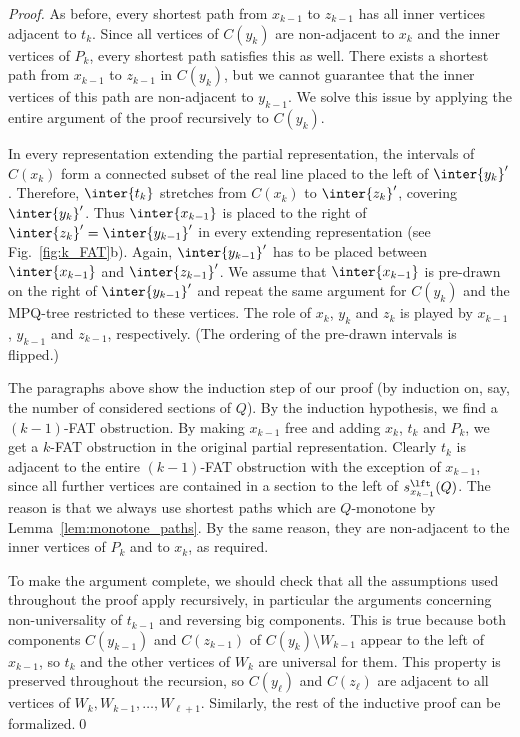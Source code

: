 \begin{proof}
As before, every shortest path from $x_{k-1}$ to $z_{k-1}$ has all inner vertices adjacent to $t_k$.
Since all vertices of $C(y_k)$ are non-adjacent to $x_k$ and the inner vertices of $P_k$, every
shortest path satisfies this as well.  There exists a shortest path from $x_{k-1}$ to
$z_{k-1}$ in $C(y_k)$, but we cannot guarantee that the inner vertices of this path are non-adjacent
to $y_{k-1}$. We solve this issue by applying the entire argument of the proof recursively to
$C(y_k)$.

In every representation extending the partial representation, the intervals of $C(x_k)$ form a
connected subset of the real line placed to the left of $\inter{y_k}'$. Therefore, $\inter{t_k}$
stretches from $C(x_k)$ to $\inter{z_k}'$, covering $\inter{y_k}'$. Thus $\inter{x_{k-1}}$ is placed
to the right of $\inter{z_k}' = \inter{y_{k-1}}'$ in every extending representation (see
Fig.~\ref{fig:k_FAT}b).  Again, $\inter{y_{k-1}}'$ has to be placed between $\inter{x_{k-1}}$ and
$\inter{z_{k-1}}'$. We assume that $\inter{x_{k-1}}$ is pre-drawn on the right of $\inter{y_{k-1}}'$
and repeat the same argument for $C(y_k)$ and the MPQ-tree restricted to these vertices. The role of
$x_k$, $y_k$ and $z_k$ is played by $x_{k-1}$, $y_{k-1}$ and $z_{k-1}$, respectively. (The ordering
of the pre-drawn intervals is flipped.)

The paragraphs above show the induction step of our proof (by induction on, say, the number of
considered sections of $Q$). By the induction hypothesis, we find a $(k-1)$-FAT obstruction.  By
making $x_{k-1}$ free and adding $x_k$, $t_k$ and $P_k$, we get a $k$-FAT obstruction in the
original partial representation.  Clearly $t_k$ is adjacent to the entire $(k-1)$-FAT obstruction
with the exception of $x_{k-1}$, since all further vertices are contained in a section to the left
of $s_{x_{k-1}}^\lft(Q)$. The reason is that we always use shortest paths which are $Q$-monotone by
Lemma~\ref{lem:monotone_paths}.  By the same reason, they are non-adjacent to the inner vertices of
$P_k$ and to $x_k$, as required.

To make the argument complete, we should check that all the assumptions used throughout the proof
apply recursively, in particular the arguments concerning non-universality of $t_{k-1}$ and
reversing big components. This is true because both components $C(y_{k-1})$ and $C(z_{k-1})$ of
$C(y_k) \setminus W_{k-1}$ appear to the left of $x_{k-1}$, so $t_k$ and the other vertices of $W_k$
are universal for them. This property is preserved throughout the recursion, so $C(y_\ell)$ and
$C(z_\ell)$ are adjacent to all vertices of $W_k,W_{k-1},\dots,W_{\ell+1}$. Similarly,
the rest of the inductive proof can be formalized.\qed
\end{proof}

